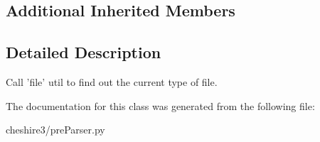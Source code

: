 \subsection*{Additional Inherited Members}


\subsection{Detailed Description}
\begin{DoxyVerb}Call 'file' util to find out the current type of file.\end{DoxyVerb}
 

The documentation for this class was generated from the following file\-:\begin{DoxyCompactItemize}
\item 
cheshire3/pre\-Parser.\-py\end{DoxyCompactItemize}
